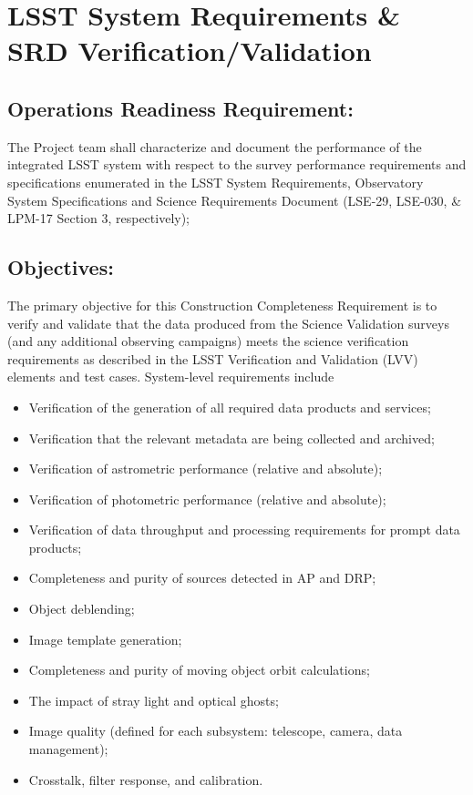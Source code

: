 \section{LSST System Requirements \& SRD Verification/Validation}  \label{sec:srd}

\subsection{Operations Readiness Requirement:}

The Project team shall characterize and document the performance of the integrated LSST system with respect to the survey performance requirements and specifications enumerated in the LSST System Requirements, Observatory System Specifications and Science Requirements Document (LSE-29, LSE-030, \& LPM-17 Section 3, respectively);

\subsection{Objectives:}

The primary objective for this Construction Completeness Requirement is to verify and validate that the data produced from the Science Validation surveys (and any additional observing campaigns) meets the science verification requirements as described in the LSST Verification and Validation (LVV) elements and test cases. System-level requirements include

\begin{itemize}
\item Verification of the generation of all required data products and services;
\item Verification that the relevant metadata are being collected and archived;
\item Verification of astrometric performance (relative and absolute);
\item Verification of photometric performance (relative and absolute);
\item Verification of data throughput and processing requirements for prompt data products;
\item Completeness and purity of sources detected in AP and DRP;
\item Object deblending;
\item Image template generation;
\item Completeness and purity of moving object orbit calculations;
\item The impact of stray light and optical ghosts;
\item Image quality (defined for each subsystem: telescope, camera, data management);
\item Crosstalk, filter response, and calibration.
\end{itemize}

